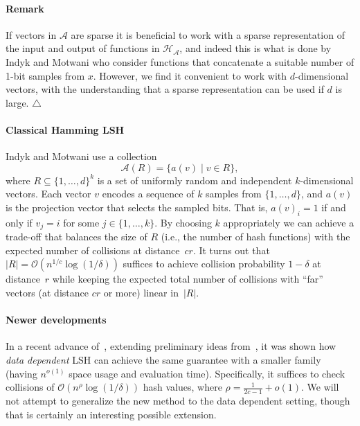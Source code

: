 \documentclass[prodmode,acmtalg]{acmsmall}
\newcommand{\Osymbol}{{\mathcal O}}
\newcommand{\BO}[1]{\Osymbol\left(#1\right)}
\begin{document}
\medskip

\paragraph{Remark} If vectors in $\mathcal{A}$ are sparse it is beneficial to work with a sparse representation of the input and output of functions in $\mathcal{H}_\mathcal{A}$, and indeed this is what is done by Indyk and Motwani who consider functions that concatenate a suitable number of 1-bit samples from $x$.
However, we find it convenient to work with $d$-dimensional vectors, with the understanding that a sparse representation can be used if $d$ is large. $\triangle$

\medskip

\paragraph{Classical Hamming LSH}
Indyk and Motwani use a collection 
$$\mathcal{A}(R) = \{ a(v) \; | \; v\in R \},$$
where $R \subseteq \{1,\dots,d\}^k$ is a set of uniformly random and independent $k$-dimensional vectors.
Each vector $v$ encodes a sequence of $k$ samples from $\{1,\dots,d\}$, and $a(v)$ is the projection vector that selects the sampled bits.
That is, $a(v)_i = 1$ if and only if $v_j = i$ for some $j\in \{1,\dots,k\}$. 
By choosing $k$ appropriately we can achieve a trade-off that balances the size of $R$ (i.e., the number of hash functions) with the expected number of collisions at distance~$cr$.
It turns out that $|R| = \BO{n^{1/c} \log(1/\delta)}$ suffices to achieve collision probability $1-\delta$ at distance~$r$ while keeping the expected total number of collisions with ``far'' vectors (at distance $cr$ or more) linear in~$|R|$.

\medskip

\paragraph{Newer developments}
In a recent advance of~\cite{DBLP:conf/stoc/AndoniR15}, extending preliminary ideas from~\cite{andoni2014beyond}, it was shown how \emph{data dependent} LSH can achieve the same guarantee with a smaller family (having $n^{o(1)}$ space usage and evaluation time).
Specifically, it suffices to check collisions of $\BO{n^\rho \log(1/\delta)}$ hash values, where $\rho = \tfrac{1}{2c-1}+o(1)$.
We will not attempt to generalize the new method to the data dependent setting, though that is certainly an interesting possible extension.
\end{document}
